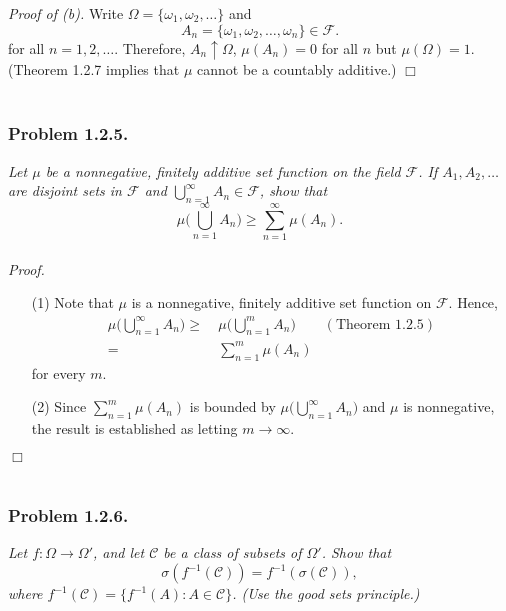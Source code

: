 \documentclass{article}
\begin{document}
\emph{Proof of (b).}
  Write $\Omega = \{ \omega_1, \omega_2, \ldots \}$ and
  \[
    A_n = \{ \omega_1, \omega_2, \ldots, \omega_n \} \in \mathscr{F}.
  \]
  for all $n = 1, 2, \ldots$.
  Therefore, $A_n \uparrow \Omega$, $\mu(A_n) = 0$ for all $n$ but $\mu(\Omega) = 1$.
  (Theorem 1.2.7 implies that $\mu$ cannot be a countably additive.)
$\Box$ \\\\






\subsubsection*{Problem 1.2.5.}
\emph{Let $\mu$ be a nonnegative,
finitely additive set function on the field $\mathscr{F}$.
If $A_1, A_2, \ldots$ are disjoint sets in $\mathscr{F}$
and $\bigcup_{n=1}^{\infty} A_n \in \mathscr{F}$, show that}
\[
  \mu \Bigg( \bigcup_{n=1}^{\infty} A_n \Bigg)
  \geq
  \sum_{n=1}^{\infty} \mu(A_n).
\] \\



\emph{Proof.}
\begin{enumerate}
\item[(1)]
  Note that $\mu$ is a nonnegative, finitely additive set function on $\mathscr{F}$.
  Hence,
  \begin{align*}
    \mu \Bigg( \bigcup_{n=1}^{\infty} A_n \Bigg)
    \geq
    & \:
      \mu \Bigg( \bigcup_{n=1}^{m} A_n \Bigg)
      & (\text{Theorem 1.2.5}) \\
    =
    & \:
      \sum_{n=1}^{m} \mu(A_n)
  \end{align*}
  for every $m$.

\item[(2)]
  Since $\sum_{n=1}^{m} \mu(A_n)$ is bounded by $\mu \big( \bigcup_{n=1}^{\infty} A_n \big)$
  and $\mu$ is nonnegative,
  the result is established as letting $m \to \infty$.
\end{enumerate}
$\Box$ \\\\






\subsubsection*{Problem 1.2.6.}
\emph{Let $f: \Omega \to \Omega'$, and let $\mathscr{C}$ be a class of subsets of $\Omega'$.
Show that
\[
  \sigma(f^{-1}(\mathscr{C})) = f^{-1}(\sigma(\mathscr{C})),
\]
where $f^{-1}(\mathscr{C}) = \{ f^{-1}(A) : A \in \mathscr{C} \}$.
(Use the good sets principle.)} \\
\end{document}
